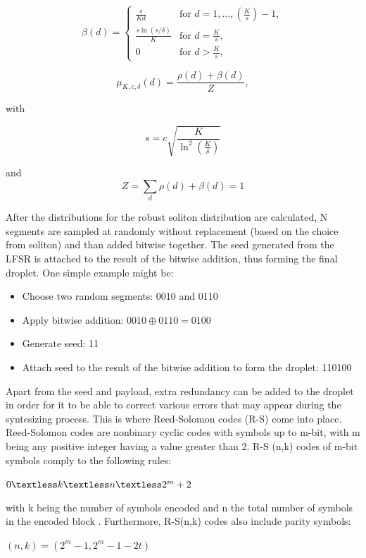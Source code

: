 \documentclass[12pt]%
{article}
\begin{document}
\[
\beta(d) = 
\begin{cases} 
\frac{s}{Kd} & \text{for } d = 1, \dots, \left(\frac{K}{s}\right) - 1, \\
\frac{s \ln(s/\delta)}{K} & \text{for } d = \frac{K}{s}, \\
0 & \text{for } d > \frac{K}{s},
\end{cases}
\]


\[
\mu_{K,c,\delta}(d) = \frac{\rho(d) + \beta(d)}{Z},
\]

with 

\[
s = c \sqrt{\frac{K}{\ln^2\left(\frac{K}{\delta}\right)}} \]

and 
\[
Z = \sum_{d} \rho(d) + \beta(d) = 1
\]


After the distributions for the robust soliton distribution are calculated, N segments are sampled at randomly without replacement (based on the choice from soliton) and  than added bitwise together. The seed generated from the LFSR is attached to the result of the bitwise addition, thus forming the final droplet. One simple example might be:


\begin{itemize}
\item Choose two random segments: 0010 and 0110
\item Apply bitwise addition: \( 0010 \oplus 0110 = 0100 \)
\item Generate seed: 11
\item Attach seed to the result of the bitwise addition to form the droplet: 110100
\end{itemize}


Apart from the seed and payload, extra redundancy can be added to the droplet in order for it to be able to correct various errors that may appear during the syntesizing process. This is where Reed-Solomon codes (R-S) come into place. Reed-Solomon codes are nonbinary cyclic codes with symbols up to m-bit, with m being any positive integer having a value greater than 2. R-S (n,k) codes of m-bit symbols comply to the following rules:
\begin{center}

$0 \textless k \textless n \textless 2^m +2$

\end{center}

with k being the number of symbols encoded and n the total number of symbols in the encoded block \cite{sklar2001reed}. Furthermore, R-S(n,k) codes also include parity symbols:

\begin{center}

$(n,k)=(2^m - 1, 2^m -1 - 2t)$

\end{center}
\end{document}
